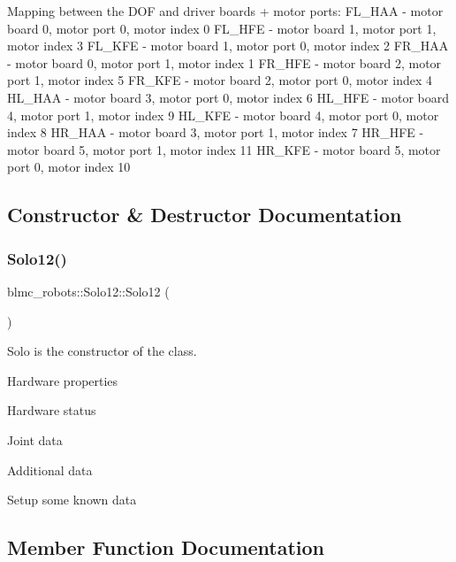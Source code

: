 Mapping between the D\+OF and driver boards + motor ports\+: F\+L\+\_\+\+H\+AA -\/ motor board 0, motor port 0, motor index 0 F\+L\+\_\+\+H\+FE -\/ motor board 1, motor port 1, motor index 3 F\+L\+\_\+\+K\+FE -\/ motor board 1, motor port 0, motor index 2 F\+R\+\_\+\+H\+AA -\/ motor board 0, motor port 1, motor index 1 F\+R\+\_\+\+H\+FE -\/ motor board 2, motor port 1, motor index 5 F\+R\+\_\+\+K\+FE -\/ motor board 2, motor port 0, motor index 4 H\+L\+\_\+\+H\+AA -\/ motor board 3, motor port 0, motor index 6 H\+L\+\_\+\+H\+FE -\/ motor board 4, motor port 1, motor index 9 H\+L\+\_\+\+K\+FE -\/ motor board 4, motor port 0, motor index 8 H\+R\+\_\+\+H\+AA -\/ motor board 3, motor port 1, motor index 7 H\+R\+\_\+\+H\+FE -\/ motor board 5, motor port 1, motor index 11 H\+R\+\_\+\+K\+FE -\/ motor board 5, motor port 0, motor index 10 

\subsection{Constructor \& Destructor Documentation}
\mbox{\label{classblmc__robots_1_1Solo12_a9be95c29e80dca13a2dafa8a0f82eec5}} 
\subsubsection{\texorpdfstring{Solo12()}{Solo12()}}
{\footnotesize\ttfamily blmc\+\_\+robots\+::\+Solo12\+::\+Solo12 (\begin{DoxyParamCaption}{ }\end{DoxyParamCaption})}



Solo is the constructor of the class. 

Hardware properties

Hardware status

Joint data

Additional data

Setup some known data

\subsection{Member Function Documentation}
\mbox{\label{classblmc__robots_1_1Solo12_aad9581cdcb139a49dbfb4673f18f7968}} 
